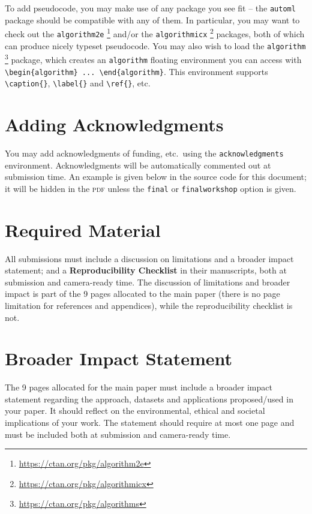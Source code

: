 \documentclass[11pt]{article}
\begin{document}
To add pseudocode, you may make use of any package you see fit -- the
\texttt{automl} package should be compatible with any of them. In particular,
you may want to check out the \texttt{algorithm2e}%
%
\footnote{\url{https://ctan.org/pkg/algorithm2e}}
%
and/or the \texttt{algorithmicx}%
%
\footnote{\url{https://ctan.org/pkg/algorithmicx}}
%
packages, both of which can produce nicely typeset pseudocode. You may also wish
to load the \texttt{algorithm}%
%
\footnote{\url{https://ctan.org/pkg/algorithms}}
%
package, which creates an \texttt{algorithm} floating environment you can access
with \verb|\begin{algorithm} ... \end{algorithm}|. This environment supports
\verb|\caption{}|, \verb|\label{}| and \verb|\ref{}|, etc.

\section{Adding Acknowledgments}

You may add acknowledgments of funding, etc.\ using the \texttt{acknowledgments}
environment. Acknowledgments will be automatically commented out at submission
time. An example is given below in the source code for this document; it will be
hidden in the \textsc{pdf} unless the \texttt{final} or \texttt{finalworkshop}
option is given.

\section{Required Material}

All submissions must include a discussion on limitations and a broader impact
statement; and a \textbf{Reproducibility Checklist} in their manuscripts, both
at submission and camera-ready time.
The discussion of limitations and broader impact is part of the 9 pages allocated
to the main paper (there is no page limitation for references and appendices), while
the reproducibility checklist is not.

\section{Broader Impact Statement}

The 9 pages allocated for the main paper must include a broader impact statement
regarding the approach, datasets and applications proposed/used in your
paper. It should reflect on the environmental, ethical and societal implications
of your work. The statement should require at most one page and must be included
both at submission and camera-ready time.
\end{document}
